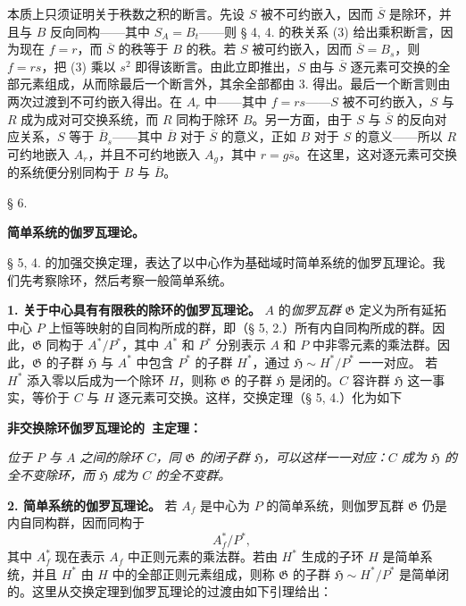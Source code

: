 \documentclass[11pt]{article}
\providecommand{\srcspaced}[1]{#1}
\providecommand{\Gcal}{\mathfrak G}
\begin{document}
本质上只须证明关于秩数之积的断言。先设 \(S\) 被不可约嵌入，因而 \(\overline S\) 是除环，并且与 \(B\) 反向同构——其中 \(S_A=B_t\)——则 § 4, 4. 的秩关系 (3) 给出乘积断言，因为现在 \(f=r\)，而 \(\overline S\) 的秩等于 \(B\) 的秩。若 \(S\) 被可约嵌入，因而 \(\overline S=B_s\)，则 \(f=rs\)，把 (3) 乘以 \(s^2\) 即得该断言。由此立即推出，\(S\) 由与 \(\overline S\) 逐元素可交换的全部元素组成，从而除最后一个断言外，其余全部都由 3. 得出。最后一个断言则由两次过渡到不可约嵌入得出。在 \(A_r\) 中——其中 \(f=rs\)——\(S\) 被不可约嵌入，\(S\) 与 \(R\) 成为成对可交换系统，而 \(R\) 同构于除环 \(B\)。另一方面，由于 \(S\) 与 \(\overline S\) 的反向对应关系，\(S\) 等于 \(\overline B_s\)——其中 \(\overline B\) 对于 \(\overline S\) 的意义，正如 \(B\) 对于 \(S\) 的意义——所以 \(R\) 可约地嵌入 \(A_r\)，并且不可约地嵌入 \(A_g\)，其中 \(r=g\overline s\)。在这里，这对逐元素可交换的系统便分别同构于 \(B\) 与 \(\overline B\)。

\begin{center}
§ 6.

\textbf{简单系统的伽罗瓦理论。}
\end{center}

§ 5, 4. 的加强交换定理，表达了以中心作为基础域时简单系统的伽罗瓦理论。我们先考察除环，然后考察一般简单系统。

\noindent\textbf{1. 关于中心具有有限秩的除环的伽罗瓦理论。} \(A\) 的\emph{伽罗瓦群} \(\Gcal\) 定义为所有延拓中心 \(P\) 上恒等映射的自同构所成的群，即（§ 5, 2.）所有内自同构所成的群。因此，\(\Gcal\) 同构于 \(A^*/P^*\)，其中 \(A^*\) 和 \(P^*\) 分别表示 \(A\) 和 \(P\) 中非零元素的乘法群。因此，\(\Gcal\) 的子群 \(\mathfrak H\) 与 \(A^*\) 中包含 \(P^*\) 的子群 \(H^*\)，通过 \(\mathfrak H\sim H^*/P^*\) 一一对应。
若 \(H^*\) 添入零以后成为一个除环 \(H\)，则称 \(\Gcal\) 的子群 \(\mathfrak H\) 是闭的。\(C\) 容许群 \(\mathfrak H\) 这一事实，等价于 \(C\) 与 \(H\) 逐元素可交换。这样，交换定理（§ 5, 4.）化为如下

\begin{center}
\textbf{\srcspaced{非交换除环伽罗瓦理论的}\
\srcspaced{主定理：}}
\end{center}

\emph{位于 \(P\) 与 \(A\) 之间的除环 \(C\)，同 \(\Gcal\) 的闭子群 \(\mathfrak H\)，可以这样一一对应：\(C\) 成为 \(\mathfrak H\) 的全不变除环，而 \(\mathfrak H\) 成为 \(C\) 的全不变群。}

\noindent\textbf{\srcspaced{2. 简单系统的伽罗瓦理论。}}
若 \(A_f\) 是中心为 \(P\) 的简单系统，则伽罗瓦群 \(\Gcal\) 仍是内自同构群，因而同构于
\[
        A_f^*/P^*,
\]
其中 \(A_f^*\) 现在表示 \(A_f\) 中正则元素的乘法群。若由 \(H^*\) 生成的子环 \(H\) 是简单系统，并且 \(H^*\) 由 \(H\) 中的全部正则元素组成，则称 \(\Gcal\) 的子群 \(\mathfrak H\sim H^*/P^*\) 是简单闭的。这里从交换定理到伽罗瓦理论的过渡由如下引理给出：
\end{document}
